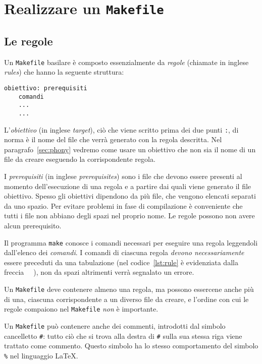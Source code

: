 \cleardoublepage
\chapter{Realizzare un \texttt{Makefile}}
\label{cha:realizzare-makefile}

\section{Le regole}
\label{sec:le-regole}

Un \texttt{Makefile} basilare è composto essenzialmente da \emph{regole}
(chiamate in inglese \emph{rules}) che hanno la seguente struttura:
\begin{lstlisting}[showtabs=true,tab=\rightarrowfill,caption={Struttura di una
regola.},label=lst:rule]
obiettivo: prerequisiti
	comandi
	...
	...
\end{lstlisting}
L'\emph{obiettivo} (in inglese \emph{target}), ciò che viene scritto prima dei
due punti \texttt{:}, di norma è il nome del file che verrà generato con la
regola descritta.  Nel paragrafo~\ref{sec:phony} vedremo come usare un obiettivo
che non sia il nome di un file da creare eseguendo la corrispondente regola.

I \emph{prerequisiti} (in inglese \emph{prerequisites}) sono i file che devono
essere presenti al momento dell'esecuzione di una regola e a partire dai quali
viene generato il file obiettivo.  Spesso gli obiettivi dipendono da più file,
che vengono elencati separati da uno spazio.  Per evitare problemi in fase di
compilazione è conveniente che tutti i file non abbiano degli spazi nel proprio
nome.  Le regole possono non avere alcun prerequisito.

Il programma \texttt{make} conosce i comandi necessari per eseguire una regola
leggendoli dall'elenco dei \emph{comandi}.  I comandi di ciascuna regola
\emph{devono necessariamente} essere preceduti da una tabulazione (nel
codice~\ref{lst:rule} è evidenziata dalla freccia
\lstinline[showtabs=true,tab=\rightarrowfill]{	}), non da spazi altrimenti
verrà segnalato un errore.

Un \texttt{Makefile} deve contenere almeno una regola, ma possono essercene
anche più di una, ciascuna corrispondente a un diverso file da creare, e
l'ordine con cui le regole compaiono nel \texttt{Makefile} \emph{non} è
importante.

Un \texttt{Makefile} può contenere anche dei commenti, introdotti dal simbolo
cancelletto \texttt{\#}: tutto ciò che si trova alla destra di \texttt{\#} sulla
sua stessa riga viene trattato come commento.  Questo simbolo ha lo stesso
comportamento del simbolo \texttt{\%} nel linguaggio \LaTeX{}.

